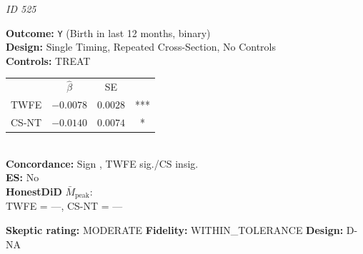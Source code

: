 \begin{tcolorbox}[
  colback=white, colframe=black!60, boxrule=0.4pt,
  arc=2pt, left=4pt, right=4pt, top=3pt, bottom=3pt]
  \footnotesize
  \textbf{\textcite{danzer2023pensions}} \hfill \textit{ID 525}\\[2pt]
  
  \begin{minipage}[t]{0.45\textwidth}
    \textbf{Outcome:} \texttt{Y} (Birth in last 12 months, binary)\\
    \textbf{Design:} Single Timing, Repeated Cross-Section, No Controls\\
    \textbf{Controls:} TREAT\\
  \end{minipage}\hfill
  \begin{minipage}[t]{0.45\textwidth}
    \begin{tabular}{@{}lccc@{}}
      & $\hat{\beta}$ & SE & \\
      TWFE & $-0.0078$ & $0.0028$ & *** \\
      CS-NT & $-0.0140$ & $0.0074$ & * \\
    \end{tabular}\\[3pt]
    \textbf{Concordance:} Sign \checkmark, TWFE sig./CS insig.\\
    \textbf{ES:} No\\
    \textbf{HonestDiD} $\bar{M}_{\text{peak}}$:\\
    TWFE = ---, CS-NT = ---
  \end{minipage}
  \tcbline
  \textbf{Skeptic rating:} MODERATE \hfill \textbf{Fidelity:} WITHIN\_TOLERANCE \hfill \textbf{Design:} D-NA
\end{tcolorbox}
\vspace{6pt}

